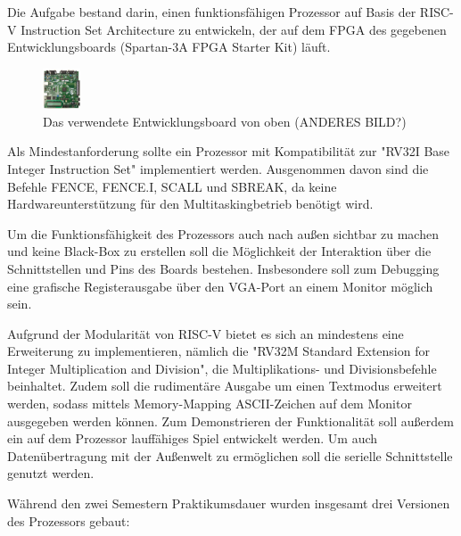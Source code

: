 

Die Aufgabe bestand darin, einen funktionsf\"ahigen Prozessor auf Basis der RISC-V Instruction Set Architecture zu entwickeln, der auf dem FPGA des gegebenen Entwicklungsboards (Spartan-3A FPGA Starter Kit) l\"auft. 
\begin{figure}[H]
	\centering
		\includegraphics[width=0.1\textwidth]{Board.png}
	\caption{Das verwendete Entwicklungsboard von oben  (ANDERES BILD?)}
	\label{fig:board}
\end{figure}

Als Mindestanforderung sollte ein Prozessor mit Kompatibilit\"at zur "RV32I Base Integer Instruction Set" implementiert werden. Ausgenommen davon sind die Befehle FENCE, FENCE.I, SCALL und SBREAK, da keine Hardwareunterst\"utzung f\"ur den Multitaskingbetrieb ben\"otigt wird.

Um die Funktionsf\"ahigkeit des Prozessors auch nach au{\ss}en sichtbar zu machen und keine Black-Box zu erstellen soll die M\"oglichkeit der Interaktion \"uber die Schnittstellen und Pins des Boards bestehen. Insbesondere soll zum Debugging eine grafische Registerausgabe \"uber den VGA-Port an einem Monitor m\"oglich sein.


Aufgrund der Modularit\"at von RISC-V bietet es sich an mindestens eine Erweiterung zu implementieren, n\"amlich die "RV32M Standard Extension for Integer Multiplication and Division", die Multiplikations- und Divisionsbefehle beinhaltet. Zudem soll die rudiment\"are Ausgabe um einen Textmodus erweitert werden, sodass mittels Memory-Mapping ASCII-Zeichen auf dem Monitor ausgegeben werden k\"onnen. Zum Demonstrieren der Funktionalit\"at soll au{\ss}erdem ein auf dem Prozessor lauff\"ahiges Spiel entwickelt werden. Um auch Daten\"ubertragung mit der Au{\ss}enwelt zu erm\"oglichen soll die serielle Schnittstelle genutzt werden.

W\"ahrend den zwei Semestern Praktikumsdauer wurden insgesamt drei Versionen des Prozessors gebaut:


